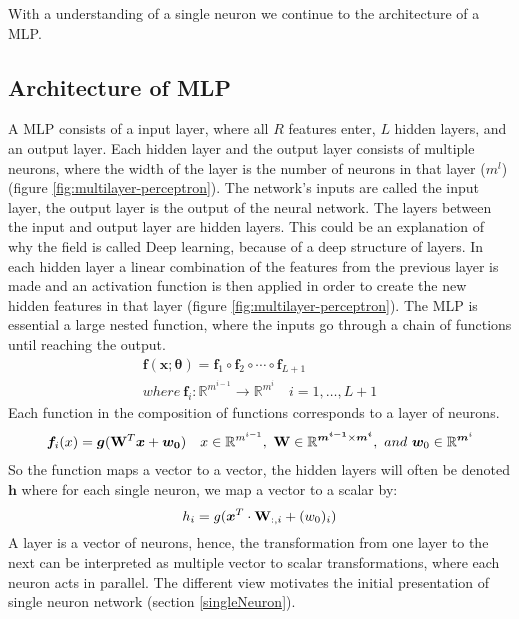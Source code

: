 With a understanding of a single neuron we continue to the architecture of a MLP.


\subsection{Architecture of MLP}\label{architectureMLP}
A MLP consists of a input layer, where all $R$ features enter, $L$ hidden layers, and an output layer. Each hidden layer and the output layer consists of multiple neurons, where the width of the layer is the number of neurons in that layer ($m^l$) (figure \ref{fig:multilayer-perceptron}). The network's inputs are called the input layer, the output layer is the output of the neural network. The layers between the input and output layer are hidden layers. This could be an explanation of why the field is called Deep learning, because of a deep structure of layers. In each hidden layer a linear combination of the features from the previous layer is made and an activation function is then applied in order to create the new hidden features in that layer (figure \ref{fig:multilayer-perceptron}). The MLP is essential a large nested function, where the inputs go through a chain of functions until reaching the output.
\begin{align*}
\bm{f}(\bm{x};\bm{\theta})=\bm{f}_1 \circ \bm{f}_2 \circ \cdots \circ \bm{f}_{L+1}\\
where \ \bm{f}_i : \mathbb{R}^{m^{i-1}} \to \mathbb{R}^{m^{i}} \quad i=1,\ldots, L+1
\end{align*}
Each function in the composition of functions corresponds to a layer of neurons.
\begin{align*}
\bm{f}_i(x)=\bm{g}(\mathbf{W}^T \bm{x} + \bm{w_0}) \quad x\in \mathbb{R}^{m^{i-1}}, \ \mathbf{W} \in \mathbb{R}^{\bm{m^{i-1}} \times \bm{m^{i}} }, \ and \ \bm{w}_0 \in \mathbb{R}^{\bm{m}^{i}}
\end{align*}
So the function maps a vector to a vector, the hidden layers will often be denoted $\bm{h}$ where for each single neuron, we map a vector to a scalar by:
$$h_i=g(\bm{x}^T \cdot \mathbf{W}_{:,i} + (w_0)_{i})$$
A layer is a vector of neurons, hence, the transformation from one layer to the next can be interpreted as multiple vector to scalar transformations, where each neuron acts in parallel. The different view motivates the initial presentation of single neuron network (section \ref{singleNeuron}).

